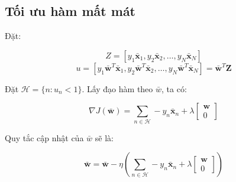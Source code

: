 \documentclass[a4paper, 12pt, oneside]{report}
\begin{document}
\subsection{Tối ưu hàm mất mát}
Đặt: 
\begin{mybox}
$$ Z = [y_1 \mathbf{\bar{x}}_1, y_2 \mathbf{\bar{x}}_2, \dots, y_N\mathbf{\bar{x}}_N] $$
$$ u = [y_1\mathbf{\bar{w}}^T\mathbf{\bar{x}}_1,y_2\mathbf{\bar{w}}^T\mathbf{\bar{x}}_2, \dots, y_N \mathbf{\bar{w}}^T \mathbf{\bar{x}}_N] = \mathbf{\bar{w}}^T\mathbf{Z}   $$


\end{mybox}
Đặt $\mathcal{H} = \{n: u_n < 1\}$. Lấy đạo hàm theo $\bar{w}$, ta có:
\begin{mybox}
$$\nabla J(\mathbf{\bar{w}}) = \sum_{n \in \mathcal{H}} - y_n\mathbf{\bar{x}}_n  + \lambda 
\left[\begin{matrix}
\mathbf{w}\\
0
\end{matrix}\right]$$ \end{mybox}
Quy tắc cập nhật của $\bar{w}$ sẽ là: 
\begin{mybox}
$$ \mathbf{\bar{w}} = \mathbf{\bar{w}} - \eta \left(\sum_{n \in \mathcal{H}} - y_n\mathbf{\bar{x}}_n  + \lambda \left[\begin{matrix}
\mathbf{w}\\
0
\end{matrix}\right]\right) $$ \end{mybox}
\end{document}
